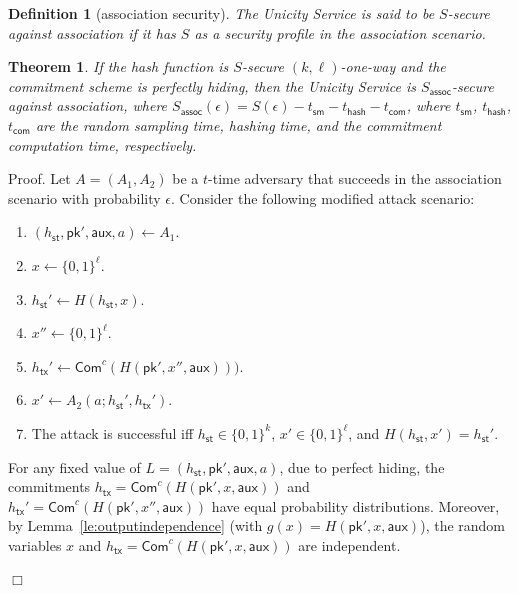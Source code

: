 \documentclass{article}
\newtheorem{definition}{Definition}[section]
\newtheorem{theorem}{Theorem}[section]
\newenvironment{proof}{\textsf{Proof}.}{\hfill$\Box$}
\newcommand{\pubkey}[0]{\mathsf{pk}}
\newcommand{\commitc}[0]{\mathsf{Com}^{c}}
\newcommand{\sthash}[0]{h_\mathsf{st}}
\newcommand{\txhash}[0]{h_\mathsf{tx}}
\newcommand{\auxd}[0]{\mathsf{aux}}
\begin{document}
\begin{definition}[association security]
The Unicity Service is said to be $S$-secure against association if it has $S$ as a security profile in the association scenario.
\end{definition}


\begin{theorem}
If the hash function is $S$-secure $(k,\ell)$-one-way and the commitment scheme is perfectly hiding, then the Unicity Service is $S_\mathsf{assoc}$-secure against association, where $S_\mathsf{assoc}(\epsilon)= S(\epsilon) - t_\mathsf{sm} - t_\mathsf{hash} - t_\mathsf{com}$, where
$t_\mathsf{sm}$, $t_\mathsf{hash}$, $t_\mathsf{com}$ are the random sampling time, hashing time, and the commitment computation time, respectively.
\end{theorem}
\begin{proof}
Let $A=(A_1,A_2)$ be a $t$-time adversary that succeeds in the association scenario with probability $\epsilon$. Consider the following modified attack scenario:
\begin{enumerate}
\item $(\sthash, \pubkey', \auxd, a)\gets A_1$.
\item $x\gets \{0,1\}^\ell$.
\item $\sthash'\gets H(\sthash,x)$.
\item $x''\gets \{0,1\}^\ell$.
\item $\txhash'\gets\commitc(H(\pubkey',x'',\auxd)))$.
\item $x'\gets A_2(a; \sthash',\txhash')$.
\item The attack is successful iff $\sthash\in\{0,1\}^k$, $x'\in\{0,1\}^\ell$, and $H(\sthash,x')=\sthash'$.
\end{enumerate}

\noindent For any fixed value of $L=(\sthash, \pubkey', \auxd, a)$, due to perfect hiding, the commitments $\txhash=\commitc(H(\pubkey',x,\auxd))$ and $\txhash'=\commitc(H(\pubkey',x'',\auxd))$ have equal probability distributions. Moreover, by Lemma~\ref{le:outputindependence} (with $g(x)=H(\pubkey',x,\auxd)$), the random variables $x$ and $\txhash=\commitc(H(\pubkey',x,\auxd))$ are independent.


\end{proof}
\end{document}
